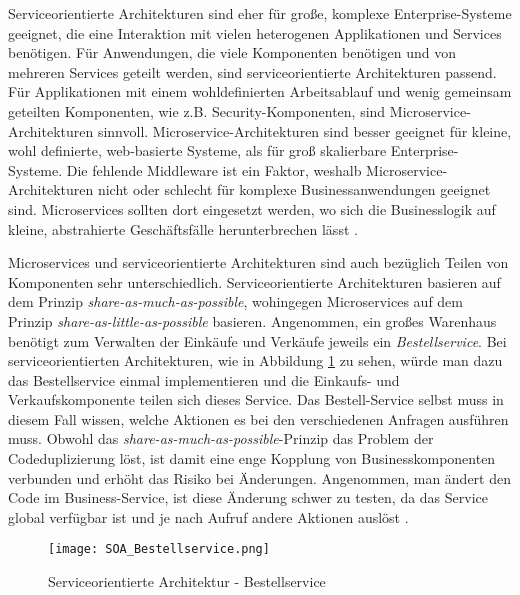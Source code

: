 Serviceorientierte Architekturen sind eher für große, komplexe Enterprise-Systeme geeignet, die eine Interaktion mit vielen heterogenen Applikationen und Services benötigen. Für Anwendungen, die viele Komponenten benötigen und von mehreren Services geteilt werden, sind serviceorientierte Architekturen passend.
Für Applikationen mit einem wohldefinierten Arbeitsablauf und wenig gemeinsam geteilten Komponenten, wie z.B. Security-Komponenten, sind Microservice-Architekturen sinnvoll.
Microservice-Architekturen sind besser geeignet für kleine, wohl definierte, web-basierte Systeme, als für groß skalierbare Enterprise-Systeme. Die fehlende Middleware ist ein Faktor, weshalb Microservice-Architekturen nicht oder schlecht für komplexe Businessanwendungen geeignet sind. Microservices sollten dort eingesetzt werden, wo sich die Businesslogik auf kleine, abstrahierte Geschäftsfälle herunterbrechen lässt \cite{MicroservicesVSSOA}.

Microservices und serviceorientierte Architekturen sind auch bezüglich Teilen von Komponenten sehr unterschiedlich. Serviceorientierte Architekturen basieren auf dem Prinzip \textit{share-as-much-as-possible}, wohingegen Microservices auf dem Prinzip \textit{share-as-little-as-possible} basieren.
Angenommen, ein großes Warenhaus benötigt zum Verwalten der Einkäufe und Verkäufe jeweils ein \textit{Bestellservice}. Bei serviceorientierten Architekturen, wie in Abbildung \ref{fig:SOA_Bestellservice} zu sehen, würde man dazu das Bestellservice einmal implementieren und die Einkaufs- und Verkaufskomponente teilen sich dieses Service. Das Bestell-Service selbst muss in diesem Fall wissen, welche Aktionen es bei den verschiedenen Anfragen ausführen muss.
Obwohl das \textit{share-as-much-as-possible}-Prinzip das Problem der Codeduplizierung löst, ist damit eine enge Kopplung von Businesskomponenten verbunden und erhöht das Risiko bei Änderungen. Angenommen, man ändert den Code im Business-Service, ist diese Änderung schwer zu testen, da das Service global verfügbar ist und je nach Aufruf andere Aktionen auslöst \cite{MicroservicesVSSOA}.

\begin{figure}[H]
	\begin{center}
		\texttt{[image: SOA\_Bestellservice.png]}
		\caption[Serviceorientierte Architektur - Bestellservice]{Serviceorientierte Architektur - Bestellservice \cite{MicroservicesVSSOA}}
		\label{fig:SOA_Bestellservice}
	\end{center}
\end{figure}


